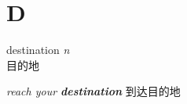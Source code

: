 \section{D}

\item[] {
    \lettrine{destination}{}  
    \textit{n} 
    \\
    目的地

    \textit{reach your \textbf{destination}}
    到达目的地

}
